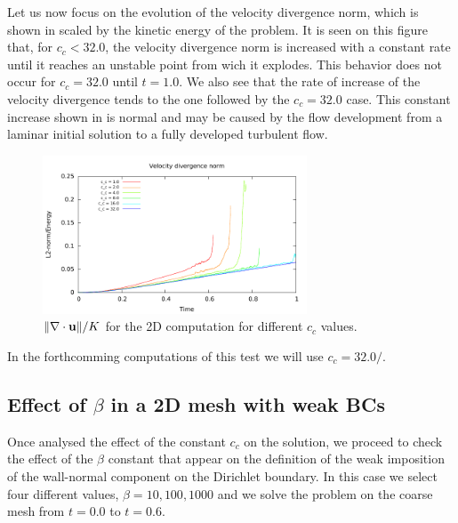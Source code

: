 Let us now focus on the evolution of the velocity divergence norm, which is shown in  scaled by the kinetic energy of the problem. It is seen on this figure that, for $ c_c<32.0 $, the velocity divergence norm is increased with a constant rate until it reaches an unstable point from wich it explodes. This behavior does not occur for $ c_c=32.0 $ until $ t=1.0 $. We also see that the rate of increase of the velocity divergence tends to the one followed by the $ c_c=32.0 $ case. This constant increase shown in  is normal and may be caused by the flow development from a laminar initial solution to a fully developed turbulent flow.
\begin{figure}[h!]
  \centering
  \includegraphics[width=0.7\textwidth]{Figures/Chapter8/strong/divel}
  \caption{$\|\nabla\cdot{\bf u}\|/K$ for the 2D computation for different $ c_c $ values.}
  \label{fig-NACA_c_c_divel}
\end{figure}
In the forthcomming computations of this test we will use $ c_c=32.0/ $.

\subsection{Effect of $ \beta $ in a 2D mesh with weak BCs}
Once analysed the effect of the constant $ c_c $ on the solution, we proceed to check the effect of the $ \beta $ constant that appear on the definition of the weak imposition of the wall-normal component on the Dirichlet boundary. In this case we select four different values, $ \beta={10,100,1000} $ and we solve the problem on the coarse mesh from $ t=0.0 $ to $ t=0.6 $.

